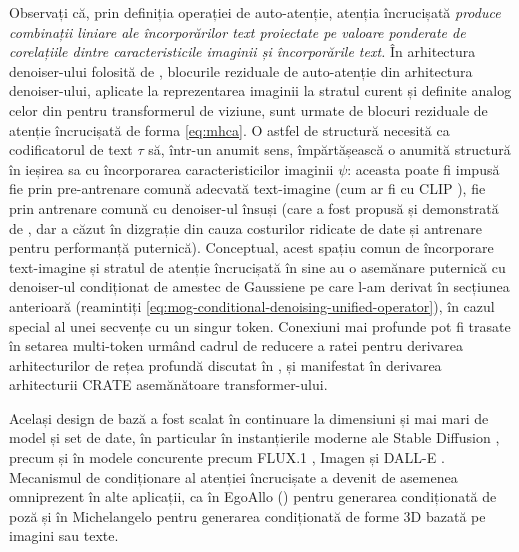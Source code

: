 \documentclass[../../book-main_ro.tex]{subfiles}
\begin{document}
Observați că, prin definiția operației de auto-atenție, atenția încrucișată
\textit{produce combinații liniare ale încorporărilor text proiectate pe valoare
ponderate de corelațiile dintre caracteristicile imaginii și încorporările text.}
În arhitectura denoiser-ului folosită de \textcite{rombach2022high}, 
blocurile reziduale de auto-atenție din arhitectura denoiser-ului, aplicate la
reprezentarea imaginii la stratul curent și definite analog
celor din  pentru transformerul de viziune, sunt urmate de blocuri
reziduale de atenție încrucișată de forma \eqref{eq:mhca}.
O astfel de structură necesită ca codificatorul de text $\tau$ să, într-un anumit sens, împărtășească o anumită
structură în ieșirea sa cu încorporarea caracteristicilor imaginii $\psi$: aceasta poate fi
impusă fie prin pre-antrenare comună adecvată text-imagine (cum ar fi cu CLIP
\cite{Radford2021-ir}), fie prin antrenare comună cu
denoiser-ul însuși (care a fost propusă și demonstrată de
\textcite{rombach2022high}, dar a căzut în dizgrație din cauza costurilor ridicate de date și
antrenare pentru performanță puternică).
Conceptual, acest spațiu comun de încorporare text-imagine și stratul de atenție încrucișată
în sine au o asemănare puternică cu
denoiser-ul condiționat de amestec de Gaussiene pe care l-am derivat în secțiunea
anterioară (reamintiți \eqref{eq:mog-conditional-denoising-unified-operator}), în
cazul special al unei secvențe cu un singur token. Conexiuni mai profunde
pot fi trasate în setarea multi-token urmând cadrul de reducere a ratei
pentru derivarea arhitecturilor de rețea profundă discutat în
, și manifestat în derivarea arhitecturii CRATE
asemănătoare transformer-ului.

Același design de bază a fost scalat în continuare la dimensiuni și mai mari de model și set de date,
în particular în instanțierile moderne ale Stable Diffusion
\cite{DBLP:conf/icml/EsserKBEMSLLSBP24}, precum și în modele concurente precum
FLUX.1 \cite{Labs2025-fb}, Imagen \cite{Saharia2022-na} și DALL-E \cite{Ramesh2022-nu}. 
Mecanismul de condiționare al atenției încrucișate a devenit de asemenea omniprezent în
alte aplicații, ca în EgoAllo () pentru generarea condiționată de poză și în Michelangelo \cite{zhao2023michelangelo} pentru generarea condiționată de forme 3D bazată pe imagini sau texte.
\end{document}

